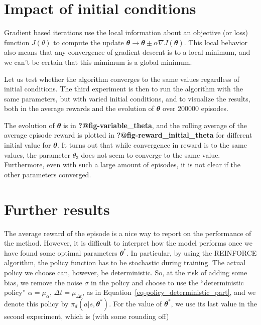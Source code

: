 \documentclass[
  letterpaper,
]{report}
\theoremstyle{definition}
\theoremstyle{plain}
\theoremstyle{definition}
\theoremstyle{remark}
\begin{document}
\section{Impact of initial
conditions}\label{impact-of-initial-conditions}

Gradient based iterations use the local information about an objective
(or loss) function \(J(\theta)\) to compute the update
\(\mathbfit{\theta} \rightarrow \mathbfit{\theta} \pm \alpha \nabla J(\mathbfit{\theta})\).
This local behavior also means that any convergence of gradient descent
is to a local minimum, and we can't be certain that this mimimum is a
global minimum.

Let us test whether the algorithm converges to the same values
regardless of initial conditions. The third experiment is then to run
the algorithm with the same parameters, but with varied initial
conditions, and to visualize the results, both in the average rewards
and the evolution of \(\mathbfit{\theta}\) over 200000 episodes.

The evolution of \(\mathbfit{\theta}\) is in
\textbf{?@fig-variable\_theta}, and the rolling average of the average
episode reward is plotted in \textbf{?@fig-reward\_initial\_theta} for
different initial value for \(\mathbfit{\theta}\). It turns out that
while convergence in reward is to the same values, the parameter
\(\theta_3\) does not seem to converge to the same value. Furthermore,
even with such a large amount of episodes, it is not clear if the other
parameters converged.

\section{Further results}\label{further-results}

The average reward of the episode is a nice way to report on the
performance of the method. However, it is difficult to interpret how the
model performs once we have found some optimal parameters
\(\mathbfit{\theta}^*\). In particular, by using the REINFORCE
algorithm, the policy function has to be stochastic during training. The
actual policy we choose can, however, be deterministic. So, at the risk
of adding some bias, we remove the noise \(\sigma\) in the policy and
choose to use the ``deterministic policy'' \(\alpha = \mu_\alpha\),
\(\Delta t = \mu_{\Delta t}\), as in
Equation~\ref{eq-policy_deterministic_part}, and we denote this policy
by \(\pi_d(a|s,\mathbfit{\theta}^*)\). For the value of
\(\mathbfit{\theta}^*\), we use its last value in the second experiment,
which is (with some rounding off)
\end{document}
